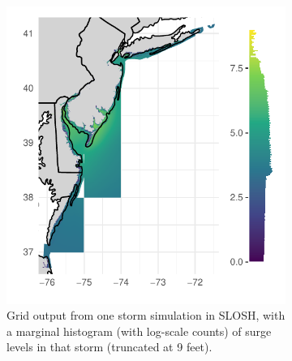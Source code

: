 \begin{figure}[t!]
    \centering
    \begin{subfigure}[t]{0.48\textwidth}
        \centering
        \includegraphics[width=0.99\linewidth]{./plots/slosh1run_loghist}
        \caption{Grid output from one storm simulation in SLOSH, with a marginal
            histogram (with log-scale counts) of surge levels in that storm 
            (truncated at 9 feet).\label{fig:slosh1run}}
    \end{subfigure}%
    ~ 
    \begin{subfigure}[t]{0.48\textwidth}
        \centering

\end{subfigure}
\end{figure}
